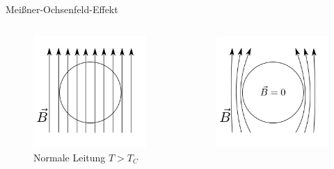 \begin{frame}{Meißner-Ochsenfeld-Effekt}
\begin{columns}
\begin{column}{0.49\textwidth}
  \begin{figure}
    \includegraphics[width = \textwidth]{bilder/supra_1.pdf}
    \caption{Normale Leitung $T > T_{C}$}
    \label{fig: bfeld_normale_leitung}
  \end{figure}
\end{column}
\begin{column}{0.49\textwidth}
  \begin{figure}
    \includegraphics[width = \textwidth]{bilder/supra_2.pdf}

\end{figure}
\end{column}
\end{columns}
\end{frame}

